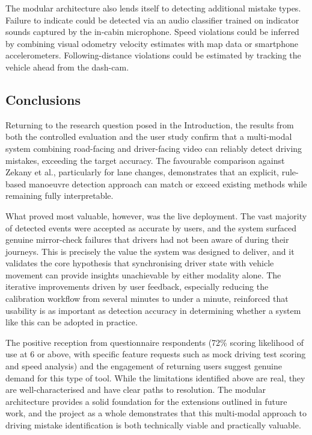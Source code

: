 \documentclass{article}
\begin{document}
The modular architecture also lends itself to detecting additional mistake types. Failure to indicate could be detected via an audio classifier trained on indicator sounds captured by the in-cabin microphone. Speed violations could be inferred by combining visual odometry velocity estimates with map data or smartphone accelerometers. Following-distance violations could be estimated by tracking the vehicle ahead from the dash-cam.

\subsection{Conclusions}
Returning to the research question posed in the Introduction, the results from both the controlled evaluation and the user study confirm that a multi-modal system combining road-facing and driver-facing video can reliably detect driving mistakes, exceeding the target accuracy. The favourable comparison against Zekany et al., particularly for lane changes, demonstrates that an explicit, rule-based manoeuvre detection approach can match or exceed existing methods while remaining fully interpretable.

What proved most valuable, however, was the live deployment. The vast majority of detected events were accepted as accurate by users, and the system surfaced genuine mirror-check failures that drivers had not been aware of during their journeys. This is precisely the value the system was designed to deliver, and it validates the core hypothesis that synchronising driver state with vehicle movement can provide insights unachievable by either modality alone. The iterative improvements driven by user feedback, especially reducing the calibration workflow from several minutes to under a minute, reinforced that usability is as important as detection accuracy in determining whether a system like this can be adopted in practice.

The positive reception from questionnaire respondents (72\% scoring likelihood of use at 6 or above, with specific feature requests such as mock driving test scoring and speed analysis) and the engagement of returning users suggest genuine demand for this type of tool. While the limitations identified above are real, they are well-characterised and have clear paths to resolution. The modular architecture provides a solid foundation for the extensions outlined in future work, and the project as a whole demonstrates that this multi-modal approach to driving mistake identification is both technically viable and practically valuable.
\end{document}
